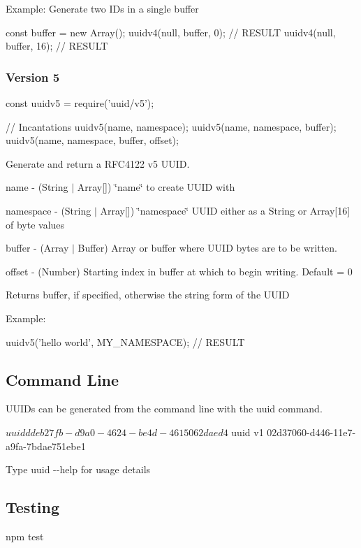 Example\+: Generate two I\+Ds in a single buffer


\begin{DoxyCode}
const buffer = new Array();
uuidv4(null, buffer, 0);  // RESULT
uuidv4(null, buffer, 16); // RESULT
\end{DoxyCode}


\subsubsection*{Version 5}


\begin{DoxyCode}
const uuidv5 = require('uuid/v5');

// Incantations
uuidv5(name, namespace);
uuidv5(name, namespace, buffer);
uuidv5(name, namespace, buffer, offset);
\end{DoxyCode}


Generate and return a R\+F\+C4122 v5 U\+U\+ID.


\begin{DoxyItemize}
\item {\ttfamily name} -\/ (String $\vert$ Array\mbox{[}\mbox{]}) \char`\"{}name\char`\"{} to create U\+U\+ID with
\item {\ttfamily namespace} -\/ (String $\vert$ Array\mbox{[}\mbox{]}) \char`\"{}namespace\char`\"{} U\+U\+ID either as a String or Array\mbox{[}16\mbox{]} of byte values
\item {\ttfamily buffer} -\/ (Array $\vert$ Buffer) Array or buffer where U\+U\+ID bytes are to be written.
\item {\ttfamily offset} -\/ (Number) Starting index in {\ttfamily buffer} at which to begin writing. Default = 0
\end{DoxyItemize}

Returns {\ttfamily buffer}, if specified, otherwise the string form of the U\+U\+ID

Example\+:


\begin{DoxyCode}
uuidv5('hello world', MY\_NAMESPACE);  // RESULT
\end{DoxyCode}


\subsection*{Command Line}

U\+U\+I\+Ds can be generated from the command line with the {\ttfamily uuid} command.


\begin{DoxyCode}
$ uuid
ddeb27fb-d9a0-4624-be4d-4615062daed4

$ uuid v1
02d37060-d446-11e7-a9fa-7bdae751ebe1
\end{DoxyCode}


Type {\ttfamily uuid -\/-\/help} for usage details

\subsection*{Testing}


\begin{DoxyCode}
npm test
\end{DoxyCode}
 